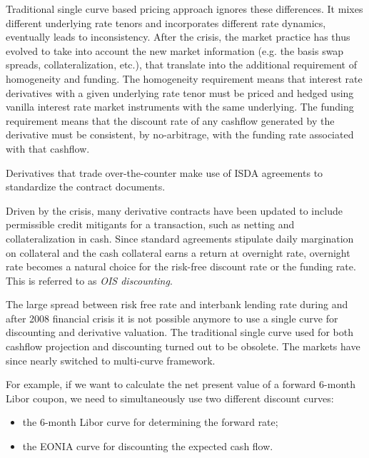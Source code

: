 Traditional single curve based pricing approach ignores these differences. 
It mixes different underlying rate tenors and incorporates different rate dynamics,
eventually leads to inconsistency.
After the crisis, the market practice has thus evolved to take into account the new
market information (e.g. the basis swap spreads, collateralization, etc.), that
translate into the additional requirement of homogeneity and funding. 
The homogeneity requirement means that interest rate derivatives with a given
underlying rate tenor must be priced and hedged using vanilla interest rate
market instruments with the same underlying. The funding requirement means that 
the discount rate of any cashflow generated by the derivative must be consistent, 
by no-arbitrage, with the funding rate associated with that cashflow. 

Derivatives that trade over-the-counter make use of ISDA agreements to
standardize the contract documents. 

Driven by the crisis, many derivative contracts have been updated to include permissible credit mitigants for a transaction, such as netting and collateralization in cash.
Since standard agreements stipulate daily margination on collateral and the cash
collateral earns a return at overnight rate,
overnight rate becomes a natural choice for the risk-free discount rate or
the funding rate. This is referred to as \emph{OIS discounting}.

The large spread between risk free rate and interbank lending rate during and after
2008 financial crisis it is not possible anymore to use a single curve for
discounting and derivative valuation. The traditional single curve used for both cashflow projection and discounting turned out to be obsolete. The markets
have since nearly switched to multi-curve framework. 

For example, if we want to calculate the net present value of a forward 6-month Libor coupon, we need to simultaneously use two different discount curves:

\begin{itemize}
\tightlist
\item the 6-month Libor curve for determining the forward rate;
\item the EONIA curve for discounting the expected cash flow.
\end{itemize}


